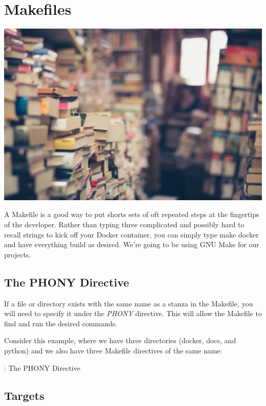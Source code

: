 \chapter{Makefiles}

\includegraphics[scale=0.20]{images/books-1163695_1920.jpg}

\justify{}
A Makefile is a good way to put shorts sets of oft repeated steps at the
fingertips of the developer. Rather than typing three complicated and
possibly hard to recall strings to kick off your Docker container, you
can simply type make docker and have everything build as desired. We're
going to be using GNU Make for our projects.

\section{The PHONY Directive}

\justify{}
If a file or directory exists with the same name as a stanza in the
Makefile, you will need to specify it under the \emph{PHONY} directive.
This will allow the Makefile to find and run the desired commands.

\justify{}
Consider this example, where we have three directories (docker, docs,
and python) and we also have three Makefile directives of the same name:

\begin{mybox}{\thetcbcounter: The PHONY Directive}
	
\end{mybox}

\section{Targets}

